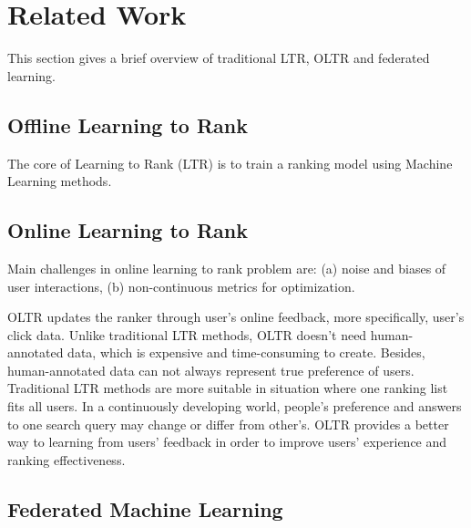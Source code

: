 \section{Related Work}

This section gives a brief overview of traditional LTR, OLTR and federated learning. 

\subsection{Offline Learning to Rank}
The core of Learning to Rank (LTR) is to train a ranking model using Machine Learning methods.

\subsection{Online Learning to Rank}
Main challenges in online learning to rank problem are: (a) noise and biases of user interactions, (b) non-continuous metrics for optimization.

OLTR updates the ranker through user's online feedback, more specifically, user's click data. Unlike traditional LTR methods, OLTR doesn't need human-annotated data, which is expensive and time-consuming to create. Besides, human-annotated data can not always represent true preference of users. Traditional LTR methods are more suitable in situation where one ranking list fits all users. In a continuously developing world, people's preference and answers to one search query may change or differ from other's. OLTR provides a better way to learning from users' feedback in order to improve users' experience and ranking effectiveness.

\subsection{Federated Machine Learning}





